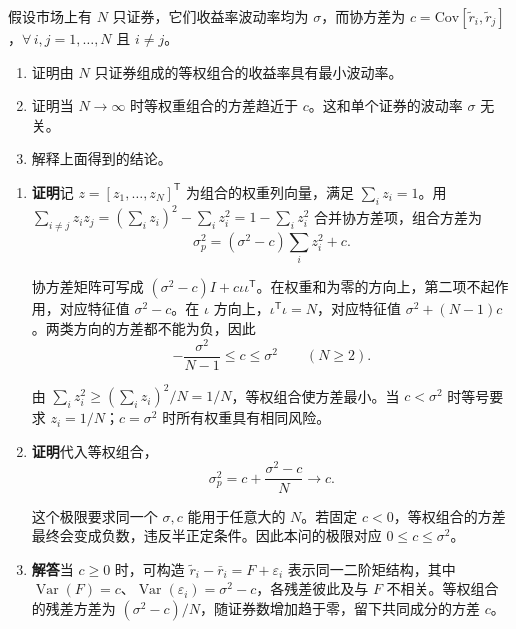 \par\noindent\begin{minipage}{\linewidth}
\begin{problem}
 假设市场上有 $N$ 只证券，它们收益率波动率均为 $\sigma$，而协方差为 $c=\mathrm{Cov}[\tilde{r}_{i},\tilde{r}_{j}]$，$\forall\, i,j=1,\dots,N$ 且 $i\ne j$。
\begin{enumerate}[label=(\alph*)]
    \item 证明由 $N$ 只证券组成的等权组合的收益率具有最小波动率。
    \item 证明当 $N\to\infty$ 时等权重组合的方差趋近于 $c$。这和单个证券的波动率 $\sigma$ 无关。
    \item 解释上面得到的结论。
\end{enumerate}
\end{problem}
\end{minipage}\par
{}
\begin{solution}
\begin{enumerate}[label=(\alph*)]
\item \textbf{证明}\quad 记 $z=[z_1,\ldots,z_N]^{\mathsf T}$ 为组合的权重列向量，满足 $\sum_i z_i=1$。用 $\sum_{i\ne j}z_i z_j=(\sum_i z_i)^2-\sum_i z_i^2=1-\sum_i z_i^2$ 合并协方差项，组合方差为
\[
 \sigma_p^2=(\sigma^2-c)\sum_i z_i^2+c.
\]

协方差矩阵可写成 $(\sigma^2-c)I+c\iota\iota^{\mathsf T}$。在权重和为零的方向上，第二项不起作用，对应特征值 $\sigma^2-c$。在 $\iota$ 方向上，$\iota^{\mathsf T}\iota=N$，对应特征值 $\sigma^2+(N-1)c$。两类方向的方差都不能为负，因此
\[
 -\frac{\sigma^2}{N-1}\le c\le\sigma^2\qquad(N\ge2).
\]

由 $\sum_i z_i^2\ge(\sum_i z_i)^2/N=1/N$，等权组合使方差最小。当 $c<\sigma^2$ 时等号要求 $z_i=1/N$；$c=\sigma^2$ 时所有权重具有相同风险。
\item \textbf{证明}\quad 代入等权组合，
\[
 \sigma_p^2=c+\frac{\sigma^2-c}{N}\longrightarrow c.
\]

这个极限要求同一个 $\sigma,c$ 能用于任意大的 $N$。若固定 $c<0$，等权组合的方差最终会变成负数，违反半正定条件。因此本问的极限对应 $0\le c\le\sigma^2$。
\item \textbf{解答}\quad 当 $c\ge0$ 时，可构造 $\widetilde r_i-\bar r_i=F+\varepsilon_i$ 表示同一二阶矩结构，其中 $\operatorname{Var}(F)=c$、$\operatorname{Var}(\varepsilon_i)=\sigma^2-c$，各残差彼此及与 $F$ 不相关。等权组合的残差方差为 $(\sigma^2-c)/N$，随证券数增加趋于零，留下共同成分的方差 $c$。\qedhere
\end{enumerate}
\end{solution}

